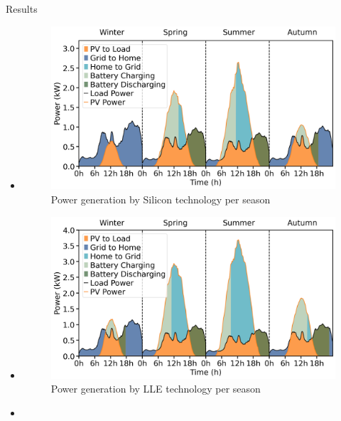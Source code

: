 \begin{frame}[c]{Results}
\begin{itemize}
        \item<only@3>[]
            \begin{figure}
                \centering
                \includegraphics[width=\columnwidth]{Figures/SI_power_distribution.png}
                \caption{Power generation by Silicon technology per season}
            \end{figure}

        \item<only@4>[]
            \begin{figure}
                \centering
                \includegraphics[width=\columnwidth]{Figures/LLE_power_distribution.png}
                \caption{Power generation by LLE technology per season}
            \end{figure}

        \item<only@5>[]
            \begin{figure}[htbp]
                \centering
                

\end{figure}
\end{itemize}
\end{frame}
